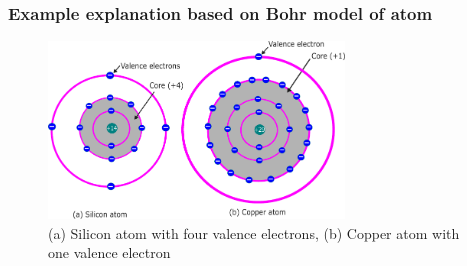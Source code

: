 \begin{frame}
	\frametitle{Example explanation based on Bohr model of atom}
        \begin{figure}
            \centering
            \includegraphics[width=0.7\textwidth]{fig/lec02/Cu_Si_atom1.pdf}
            \caption{(a) Silicon atom with four valence electrons, (b) Copper atom with one valence electron}
        \end{figure}
\end{frame}

